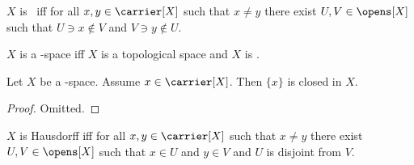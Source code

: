\begin{definition}\label{teeone}
    $X$ is \teeone\ iff
    for all $x,y\in\carrier[X]$ such that $x\neq y$
    there exist $U, V\in\opens[X]$ such that
    $U\ni x\notin V$ and $V\ni y\notin U$.
\end{definition}

\begin{abbreviation}\label{teeone_space}
    $X$ is a \teeone-space iff $X$ is a topological space and
    $X$ is \teeone.
\end{abbreviation}

\begin{proposition}\label{teeone_implies_singletons_closed}
    Let $X$ be a \teeone-space.
    Assume $x \in \carrier[X]$.
    Then $\{x\}$ is closed in $X$.
\end{proposition}
\begin{proof}
    Omitted.
\end{proof}
%

\begin{definition}\label{is_hausdorff}
    $X$ is Hausdorff iff
    for all $x,y\in\carrier[X]$ such that $x\neq y$
    there exist $U, V\in\opens[X]$ such that
    $x\in U$ and $y\in V$ and $U$ is disjoint from $V$.
\end{definition}

